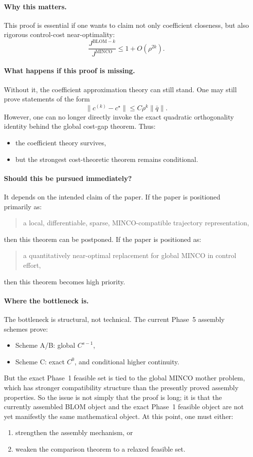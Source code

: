 \paragraph{Why this matters.}
This proof is essential if one wants to claim not only coefficient closeness, but also rigorous control-cost near-optimality:
\[
\frac{J^{\mathrm{BLOM}-k}}{J^{\mathrm{MINCO}}}\le 1+O(\rho^{2k}).
\]

\paragraph{What happens if this proof is missing.}
Without it, the coefficient approximation theory can still stand.
One may still prove statements of the form
\[
\|c^{(k)}-c^\star\|\le C\rho^k\|\bar q\|.
\]
However, one can no longer directly invoke the exact quadratic orthogonality identity behind the global cost-gap theorem.
Thus:
\begin{itemize}
	\item the coefficient theory survives,
	\item but the strongest cost-theoretic theorem remains conditional.
\end{itemize}

\paragraph{Should this be pursued immediately?}
It depends on the intended claim of the paper.
If the paper is positioned primarily as:
\begin{quote}
	a local, differentiable, sparse, MINCO-compatible trajectory representation,
\end{quote}
then this theorem can be postponed.
If the paper is positioned as:
\begin{quote}
	a quantitatively near-optimal replacement for global MINCO in control effort,
\end{quote}
then this theorem becomes high priority.

\paragraph{Where the bottleneck is.}
The bottleneck is structural, not technical.
The current Phase~5 assembly schemes prove:
\begin{itemize}
	\item Scheme A/B: global \(C^{s-1}\),
	\item Scheme C: exact \(C^0\), and conditional higher continuity.
\end{itemize}
But the exact Phase~1 feasible set is tied to the global MINCO mother problem, which has stronger compatibility structure than the presently proved assembly properties.
So the issue is not simply that the proof is long; it is that the currently assembled BLOM object and the exact Phase~1 feasible object are not yet manifestly the same mathematical object.
At this point, one must either:
\begin{enumerate}
	\item strengthen the assembly mechanism, or
	\item weaken the comparison theorem to a relaxed feasible set.
\end{enumerate}

